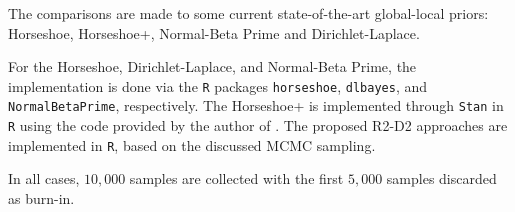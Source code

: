 \documentclass[12pt]{article}
\begin{document}
The comparisons are made to some current state-of-the-art global-local priors: Horseshoe,  Horseshoe+, Normal-Beta Prime and Dirichlet-Laplace.

For the Horseshoe, Dirichlet-Laplace, and Normal-Beta Prime, the implementation is done via the \verb|R| packages \verb|horseshoe|, \verb|dlbayes|, and \verb|NormalBetaPrime|, respectively. The Horseshoe+ is implemented through \verb|Stan| in \verb|R| using the code provided by the author of \cite{bhadra2016horseshoe+}. The proposed R2-D2 approaches are implemented in \verb|R|, based on the discussed MCMC sampling.

 In all cases, $10,000$ samples are collected with the first $5,000$ samples discarded as burn-in.

\end{document}
